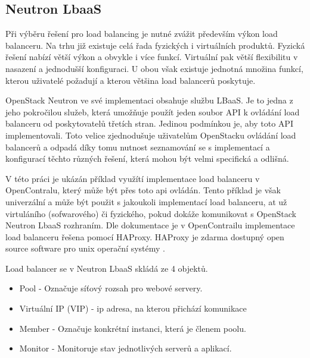 \subsection{Neutron LbaaS}

Při výběru řešení pro load balancing je nutné zvážit především výkon load balanceru. Na trhu již existuje celá řada fyzických i virtuálních produktů. Fyzická řešení nabízí větší výkon a obvykle i více funkcí. Virtuální pak větší flexibilitu v nasazení a jednodušší konfiguraci. U obou však existuje jednotná množina funkcí, kterou uživatelé požadují a kterou většina load balancerů poskytuje. 

OpenStack Neutron ve své implementaci obsahuje službu LBaaS. Je to jedna z jeho pokročilou služeb, která umožňuje použít jeden soubor API k ovládání load balanceru od poskytovatelů třetích stran. Jedinou podmínkou je, aby toto API implementovali. Toto velice zjednodušuje uživatelům OpenStacku ovládání load balancerů a odpadá díky tomu nutnost seznamování se s implementací a konfigurací těchto různých řešení, která mohou být velmi specifická a odlišná.

V této práci je ukázán příklad využítí implementace load balanceru v OpenContralu, který může být přes toto api ovládán. Tento příklad je však univerzální a může být použit s jakoukoli implementací load balanceru, at už virtuláního (sofwarového) či fyzického, pokud dokáže komunikovat s OpenStack Neutron LbaaS rozhraním. Dle dokumentace \cite{contrail_loadbalancer} je v OpenContrailu implementace load balanceru řešena pomocí HAProxy. HAProxy je zdarma dostupný open source software pro unix operační systémy \cite{HAProxy}. 

Load balancer se v Neutron LbaaS skládá ze 4 objektů.

\begin{itemize}
\item Pool - Označuje síťový rozsah pro webové servery.
\item Virtuální IP (VIP) - ip adresa, na kterou přichází komunikace
\item Member - Označuje konkrétní instanci, která je členem poolu.
\item Monitor - Monitoruje stav jednotlivých serverů a aplikací.
\end{itemize}

